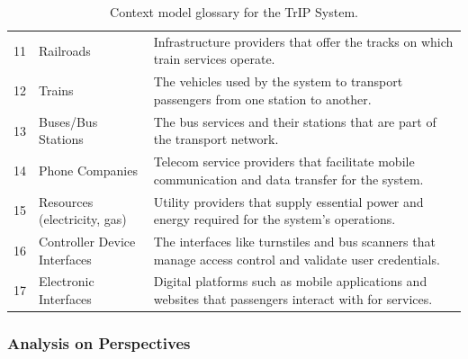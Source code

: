 \begin{table}[H]
\begin{tabular}{@{}clp{9cm}@{}}
11 & Railroads & Infrastructure providers that offer the tracks on which train services operate. \\
12 & Trains & The vehicles used by the system to transport passengers from one station to another. \\
13 & Buses/Bus Stations & The bus services and their stations that are part of the transport network. \\
14 & Phone Companies & Telecom service providers that facilitate mobile communication and data transfer for the system. \\
15 & Resources (electricity, gas) & Utility providers that supply essential power and energy required for the system’s operations. \\
16 & Controller Device Interfaces & The interfaces like turnstiles and bus scanners that manage access control and validate user credentials. \\
17 & Electronic Interfaces & Digital platforms such as mobile applications and websites that passengers interact with for services. \\
\bottomrule
\end{tabular}
\caption{Context model glossary for the TrIP System.}
\label{tab:glossary_context_view}
\end{table}

\subsubsection{Analysis on Perspectives}